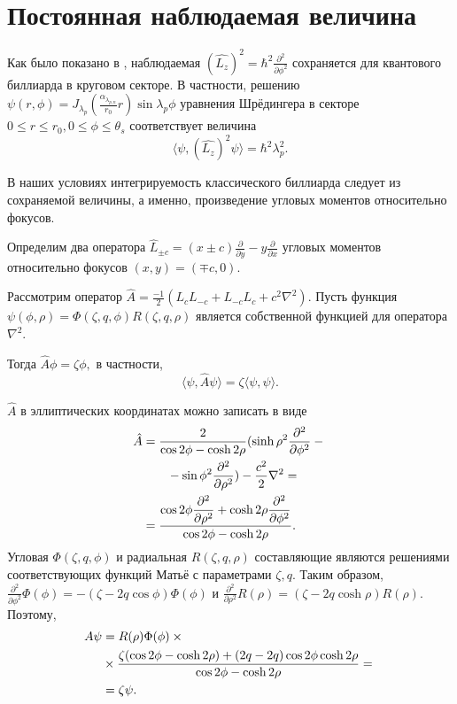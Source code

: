 \section{Постоянная наблюдаемая величина}\label{sec:ch2/sec3}

Как было показано в  \cite{wref13}, наблюдаемая  $(\hat{L_z})^2=\hbar^2\frac{\partial^2}{\partial \phi^2}$ сохраняется для квантового биллиарда в круговом секторе. 
В частности, решению $\psi(r,\phi) = J_{\lambda_p}(\frac{\alpha_{\lambda_{p,n}}}{r_0}r) \sin \lambda_p \phi$ 
уравнения Шрёдингера в секторе $0\leq r \leq r_0, 0 \leq \phi \leq \theta_s$ соответствует величина $$\langle \psi, (\hat{L_z})^2\psi\rangle = \hbar^2 \lambda_p^2.$$

В наших условиях интегрируемость классического биллиарда следует из сохраняемой величины, а именно, произведение угловых моментов относительно фокусов.


Определим два оператора  $\hat L_{\pm c} = (x \pm c)\frac{\partial}{\partial y} - y\frac{\partial}{\partial x}$ угловых моментов относительно фокусов  $(x,y) = (\mp c, 0)$.


Рассмотрим оператор  $\hat A = \frac{-1}{2}(L_c L_{-c} + L_{-c} L_c + c^2 \nabla ^2)$. Пусть функция $\psi(\phi, \rho) = \Phi(\zeta, q, \phi) R(\zeta, q, \rho)$ является собственной функцией для оператора $\nabla^2$. %

Тогда
$\hat A \phi = \zeta \phi,$
в частности,
\begin{equation}
\langle  \psi, \hat A \psi\rangle = \zeta \langle\psi, \psi\rangle. \label{eq:cons}
\end{equation}


$\hat A$ в эллиптических координатах можно записать в виде 
\begin{align*}
\hat A & = \frac{2}{\cos 2\phi - \cosh 2\rho}(\sinh{\rho}^2 \dfrac{\partial^2}{\partial \phi^2}-{}\notag\\ 
&\qquad{}-\sin\phi^2\dfrac{\partial^2}{\partial \rho^2})  -\frac{c^2}{2} \nabla^2 =\notag\\
&= \frac{\cos 2\phi \dfrac{\partial^2}{\partial \rho^2} + \cosh 2\rho \dfrac{\partial^2}{\partial \phi^2}}{\cos 2 \phi - \cosh 2 \rho}.
\end{align*}
Угловая  $\Phi(\zeta, q, \phi)$ и радиальная   $R(\zeta, q, \rho)$ составляющие являются решениями соответствующих функций Матьё с параметрами  $\zeta, q$.
Таким образом,
$\frac{\partial^2}{\partial \phi ^2} \Phi(\phi) = -(\zeta-2q\cos\phi)\Phi(\phi)$ и $\frac{\partial^2}{\partial \rho ^2} R(\rho) = (\zeta-2q\cosh\rho)R(\rho)$. 
Поэтому,
\begin{align*}
A \psi &= R(\rho)\Phi(\phi)\times {}\notag\\
&{}\times\frac{\zeta(\cos 2\phi -\cosh2\rho) + (2q-2q)\cos2\phi\cosh2\rho}{\cos 2 \phi - \cosh 2 \rho} = {}\notag \\
&{}=\zeta \psi.
\end{align*}



\FloatBarrier

